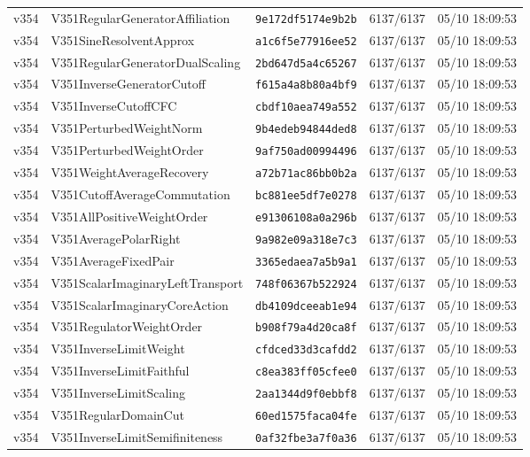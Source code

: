 \documentclass[11pt]{article}
\theoremstyle{definition}\newtheorem{deriv}{Derivation}
\begin{document}
{\begin{longtable}{@{}lllll@{}}
v354 & V351RegularGeneratorAffiliation & \texttt{9e172df5174e9b2b} & 6137/6137 & 05/10 18:09:53 \\
v354 & V351SineResolventApprox & \texttt{a1c6f5e77916ee52} & 6137/6137 & 05/10 18:09:53 \\
v354 & V351RegularGeneratorDualScaling & \texttt{2bd647d5a4c65267} & 6137/6137 & 05/10 18:09:53 \\
v354 & V351InverseGeneratorCutoff & \texttt{f615a4a8b80a4bf9} & 6137/6137 & 05/10 18:09:53 \\
v354 & V351InverseCutoffCFC & \texttt{cbdf10aea749a552} & 6137/6137 & 05/10 18:09:53 \\
v354 & V351PerturbedWeightNorm & \texttt{9b4edeb94844ded8} & 6137/6137 & 05/10 18:09:53 \\
v354 & V351PerturbedWeightOrder & \texttt{9af750ad00994496} & 6137/6137 & 05/10 18:09:53 \\
v354 & V351WeightAverageRecovery & \texttt{a72b71ac86bb0b2a} & 6137/6137 & 05/10 18:09:53 \\
v354 & V351CutoffAverageCommutation & \texttt{bc881ee5df7e0278} & 6137/6137 & 05/10 18:09:53 \\
v354 & V351AllPositiveWeightOrder & \texttt{e91306108a0a296b} & 6137/6137 & 05/10 18:09:53 \\
v354 & V351AveragePolarRight & \texttt{9a982e09a318e7c3} & 6137/6137 & 05/10 18:09:53 \\
v354 & V351AverageFixedPair & \texttt{3365edaea7a5b9a1} & 6137/6137 & 05/10 18:09:53 \\
v354 & V351ScalarImaginaryLeftTransport & \texttt{748f06367b522924} & 6137/6137 & 05/10 18:09:53 \\
v354 & V351ScalarImaginaryCoreAction & \texttt{db4109dceeab1e94} & 6137/6137 & 05/10 18:09:53 \\
v354 & V351RegulatorWeightOrder & \texttt{b908f79a4d20ca8f} & 6137/6137 & 05/10 18:09:53 \\
v354 & V351InverseLimitWeight & \texttt{cfdced33d3cafdd2} & 6137/6137 & 05/10 18:09:53 \\
v354 & V351InverseLimitFaithful & \texttt{c8ea383ff05cfee0} & 6137/6137 & 05/10 18:09:53 \\
v354 & V351InverseLimitScaling & \texttt{2aa1344d9f0ebbf8} & 6137/6137 & 05/10 18:09:53 \\
v354 & V351RegularDomainCut & \texttt{60ed1575faca04fe} & 6137/6137 & 05/10 18:09:53 \\
v354 & V351InverseLimitSemifiniteness & \texttt{0af32fbe3a7f0a36} & 6137/6137 & 05/10 18:09:53 \\

\end{longtable}}
\end{document}
